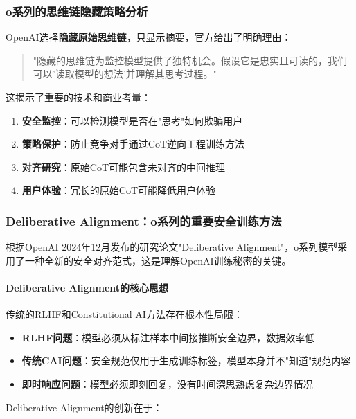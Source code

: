 \documentclass[12pt,a4paper]{article}
\begin{document}
\subsubsection{o系列的思维链隐藏策略分析}

OpenAI选择\textbf{隐藏原始思维链}，只显示摘要，官方给出了明确理由：

\begin{quote}
"隐藏的思维链为监控模型提供了独特机会。假设它是忠实且可读的，我们可以'读取模型的想法'并理解其思考过程。"
\end{quote}

这揭示了重要的技术和商业考量：

\begin{enumerate}
    \item \textbf{安全监控}：可以检测模型是否在"思考"如何欺骗用户
    \item \textbf{策略保护}：防止竞争对手通过CoT逆向工程训练方法
    \item \textbf{对齐研究}：原始CoT可能包含未对齐的中间推理
    \item \textbf{用户体验}：冗长的原始CoT可能降低用户体验
\end{enumerate}

\subsubsection{Deliberative Alignment：o系列的重要安全训练方法}

根据OpenAI 2024年12月发布的研究论文"Deliberative Alignment"，o系列模型采用了一种全新的安全对齐范式，这是理解OpenAI训练秘密的关键。

\paragraph{Deliberative Alignment的核心思想}

传统的RLHF和Constitutional AI方法存在根本性局限：

\begin{itemize}
    \item \textbf{RLHF问题}：模型必须从标注样本中间接推断安全边界，数据效率低
    \item \textbf{传统CAI问题}：安全规范仅用于生成训练标签，模型本身并不"知道"规范内容
    \item \textbf{即时响应问题}：模型必须即刻回复，没有时间深思熟虑复杂边界情况
\end{itemize}

Deliberative Alignment的创新在于：
\end{document}
